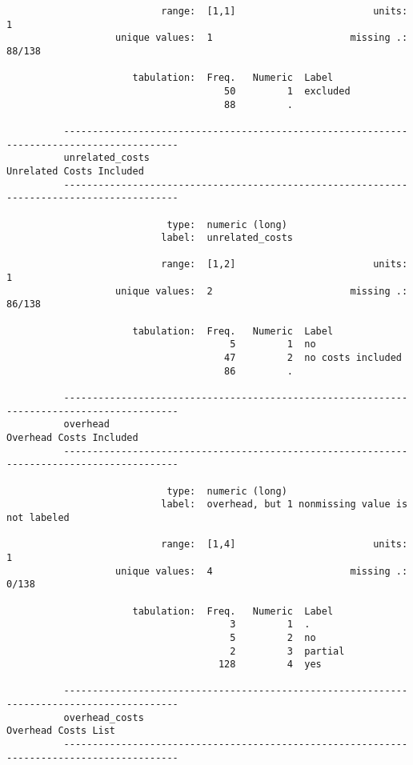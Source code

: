 \documentclass{article}
\begin{document}
\begin{verbatim}
                           range:  [1,1]                        units:  1
                   unique values:  1                        missing .:  88/138
          
                      tabulation:  Freq.   Numeric  Label
                                      50         1  excluded
                                      88         .  
          
          ------------------------------------------------------------------------------------------
          unrelated_costs                                                   Unrelated Costs Included
          ------------------------------------------------------------------------------------------
          
                            type:  numeric (long)
                           label:  unrelated_costs
          
                           range:  [1,2]                        units:  1
                   unique values:  2                        missing .:  86/138
          
                      tabulation:  Freq.   Numeric  Label
                                       5         1  no
                                      47         2  no costs included
                                      86         .  
          
          ------------------------------------------------------------------------------------------
          overhead                                                           Overhead Costs Included
          ------------------------------------------------------------------------------------------
          
                            type:  numeric (long)
                           label:  overhead, but 1 nonmissing value is not labeled
          
                           range:  [1,4]                        units:  1
                   unique values:  4                        missing .:  0/138
          
                      tabulation:  Freq.   Numeric  Label
                                       3         1  .
                                       5         2  no
                                       2         3  partial
                                     128         4  yes
          
          ------------------------------------------------------------------------------------------
          overhead_costs                                                         Overhead Costs List
          ------------------------------------------------------------------------------------------
          

\end{verbatim}
\end{document}
